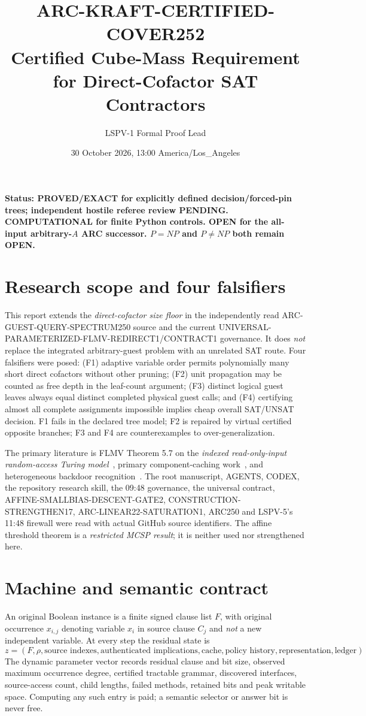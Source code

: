 \documentclass[11pt]{article}
\title{ARC-KRAFT-CERTIFIED-COVER252\\
Certified Cube-Mass Requirement for Direct-Cofactor SAT Contractors}
\author{LSPV-1 Formal Proof Lead}
\date{30 October 2026, 13:00 America/Los\_Angeles}
\begin{document}
\maketitle

\noindent\textbf{Status: PROVED/EXACT for explicitly defined decision/forced-pin trees; independent hostile referee review PENDING. COMPUTATIONAL for finite Python controls. OPEN for the all-input arbitrary-$A$ ARC successor. $P=NP$ and $P\ne NP$ both remain OPEN.}

\section{Research scope and four falsifiers}
This report extends the \emph{direct-cofactor size floor} in the independently
read ARC-GUEST-QUERY-SPECTRUM250 source and the current
UNIVERSAL-PARAMETERIZED-FLMV-REDIRECT1/CONTRACT1 governance. It does
\emph{not} replace the integrated arbitrary-guest problem with an unrelated
SAT route. Four falsifiers were posed: (F1) adaptive variable order permits
polynomially many short direct cofactors without other pruning; (F2)
unit propagation may be counted as free depth in the leaf-count argument;
(F3) distinct logical guest leaves always equal distinct completed physical
guest calls; and (F4) certifying almost all complete assignments impossible
implies cheap overall SAT/UNSAT decision. F1 fails in the declared tree model;
F2 is repaired by virtual certified opposite branches; F3 and F4 are
counterexamples to over-generalization.

The primary literature is FLMV Theorem 5.7 on the \emph{indexed
read-only-input random-access Turing model}~\cite{FLMV}, primary
component-caching work~\cite{Sang2004,Bacchus2003}, and heterogeneous
backdoor recognition~\cite{Gaspers2014}. The root manuscript, AGENTS,
CODEX, the repository research skill, the 09:48 governance, the universal
contract, AFFINE-SMALLBIAS-DESCENT-GATE2, CONSTRUCTION-STRENGTHEN17,
ARC-LINEAR22-SATURATION1, ARC250 and LSPV-5's 11:48 firewall were read
with actual GitHub source identifiers. The affine threshold theorem is a
\emph{restricted MCSP result}; it is neither used nor strengthened here.

\section{Machine and semantic contract}
An original Boolean instance is a finite signed clause list $F$, with original
occurrence $x_{i,j}$ denoting variable $x_i$ in source clause $C_j$ and
\emph{not} a new independent variable. At every step the residual state is
\[
 z=(F,\rho,\text{source indexes},\text{authenticated implications},
       \text{cache},\text{policy history},\text{representation},\text{ledger}).
\]
The dynamic parameter vector records residual clause and bit size, observed
maximum occurrence degree, certified tractable grammar, discovered interfaces,
source-access count, child lengths, failed methods, retained bits and peak
writable space. Computing any such entry is paid; a semantic selector or
answer bit is never free.
\end{document}

